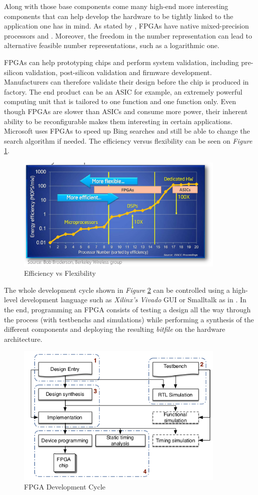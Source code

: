Along with those base components come many high-end more interesting components that can help develop the hardware to be tightly linked to the application one has in mind. As stated by \cite{Goddeke2007}, FPGAs have native mixed-precision processors and . Moreover, the freedom in the number representation can lead to alternative feasible number representations, such as a logarithmic one.

FPGAs can help prototyping chips and perform system validation, including pre-silicon validation, post-silicon validation and firmware development. Manufacturers can therefore validate their design before the chip is produced in factory. The end product can be an ASIC for example, an extremely powerful computing unit that is tailored to one function and one function only. Even though FPGAs are slower than ASICs and consume more power, their inherent ability to be reconfigurable makes them interesting in certain applications. Microsoft uses FPGAs to speed up Bing searches and still be able to change the search algorithm if needed. The efficiency versus flexibility can be seen on \emph{Figure} \ref{fig:EfficiencyVSFlexibility}.

\begin{figure}[htbp]
	\centering
		\includegraphics[width=10cm]{Figures/EfficiencyVSFlexibility.png}
	\caption[EfficiencyVSFlexibility]{Efficiency vs Flexibility}
	\label{fig:EfficiencyVSFlexibility}
\end{figure}

The whole development cycle shown in \emph{Figure} \ref{fig:FPGACycle} can be controlled using a high-level development language such as \emph{Xilinx's Vivado} GUI or Smalltalk as in \cite{XuanSang2014}. In the end, programming an FPGA consists of testing a design all the way through the process (with testbenchs and simulations) while performing a synthesis of the different components and deploying the resulting \emph{bitfile} on the hardware architecture.

\begin{figure}[htbp]
	\centering
		\includegraphics[width=10cm]{Figures/FPGACycle.png}
	\caption[FPGA Development Cycle]{FPGA Development Cycle \cite{XuanSang2014}}
	\label{fig:FPGACycle}
\end{figure}

